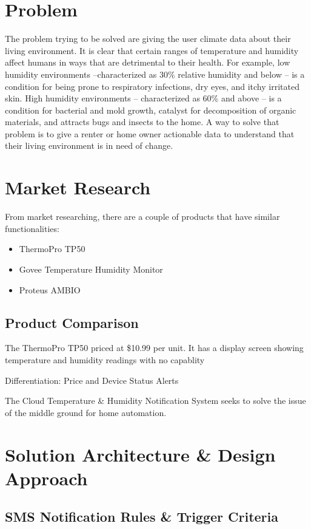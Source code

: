 \documentclass{article}
\begin{document}
\newpage

\section{Problem}
The problem trying to be solved are giving the user climate data about their living environment. It is clear that certain ranges of temperature and humidity affect humans in ways that are detrimental to their health. For example, low humidity environments --characterized as 30\% relative humidity and below -- is a condition for being prone to respiratory infections, dry eyes, and itchy irritated skin. High humidity environments -- characterized as 60\% and above -- is a condition for bacterial and mold growth, catalyst for decomposition of organic materials, and attracts bugs and insects to the home. A way to solve that problem is to give a renter or home owner actionable data to understand that their living environment is in need of change.

\section{Market Research}
From market researching, there are a couple of products that have similar functionalities:
\begin{itemize}
    \setlength{\itemindent}{3em}
    \setlength{\parskip}{0pt}
    \item ThermoPro TP50
    \item Govee Temperature Humidity Monitor
    \item Proteus AMBIO
\end{itemize}

\subsection{Product Comparison}
The ThermoPro TP50 priced at \$10.99 per unit. It has a display screen showing temperature and humidity readings with no capablity

Differentiation: Price and Device Status Alerts

The Cloud Temperature \& Humidity Notification System seeks to solve the issue of the middle ground for home automation.

\section{Solution Architecture \& Design Approach}
\subsection{SMS Notification Rules \& Trigger Criteria}
\end{document}

